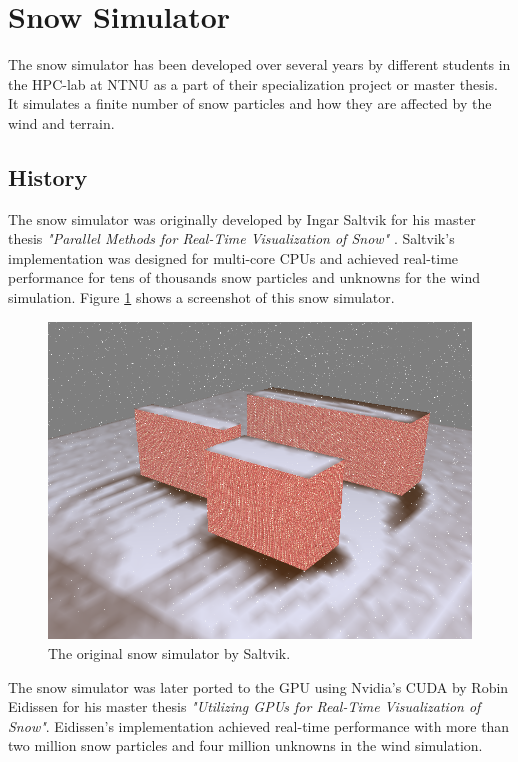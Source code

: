 \section{Snow Simulator}

The snow simulator has been developed over several years by different students in 
the HPC-lab at NTNU as a part of their specialization project or master thesis. 
It simulates a finite number of snow particles and how they are affected by the 
wind and terrain. 

\subsection{History}

The snow simulator was originally developed by Ingar Saltvik for his master
thesis \emph{"Parallel Methods for Real-Time Visualization of Snow"}
\cite{originalSnowThesis}. Saltvik's implementation was designed for multi-core
CPUs and achieved real-time performance for tens of thousands snow particles
and unknowns for the wind simulation. Figure \ref{fig:originalSnow} shows a 
screenshot of this snow simulator.

\begin{figure}[ht]
	\center
	\includegraphics[width=1.0\textwidth]{images/snow/serial/snow5}
	\caption{The original snow simulator by Saltvik.}
	\label{fig:originalSnow}
\end{figure}

The snow simulator was later ported to the GPU using Nvidia's CUDA by Robin 
Eidissen for his master thesis \emph{"Utilizing GPUs for Real-Time Visualization of Snow"}\cite{gpuSnowThesis}.
Eidissen's implementation achieved real-time performance with more than two million 
snow particles and four million unknowns in the wind simulation. 

